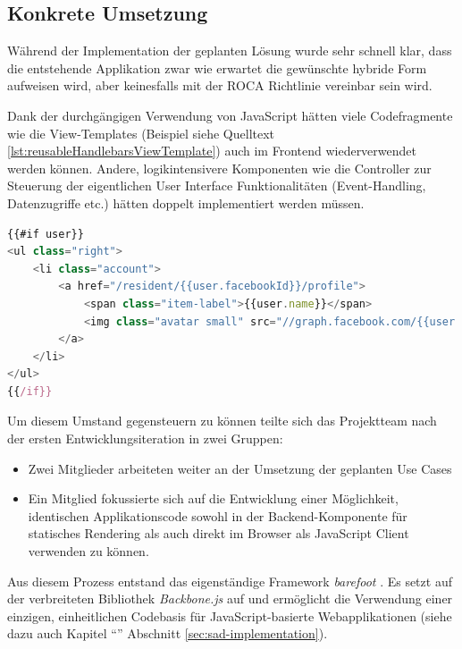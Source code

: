 \subsection*{Konkrete Umsetzung}

Während der Implementation der geplanten Lösung wurde sehr schnell klar, dass die entstehende Applikation zwar wie erwartet die gewünschte hybride Form aufweisen wird, aber keinesfalls mit der ROCA Richtlinie \emph{} vereinbar sein wird.

Dank der durchgängigen Verwendung von JavaScript hätten viele Codefragmente wie die View-Templates (Beispiel siehe Quelltext \ref{lst:reusableHandlebarsViewTemplate}) auch im Frontend wiederverwendet werden können. Andere, logikintensivere Komponenten wie die Controller zur Steuerung der eigentlichen User Interface Funktionalitäten (Event-Handling, Datenzugriffe etc.) hätten doppelt implementiert werden müssen.

\begin{lstlisting}[language=JavaScript, firstnumber=31, caption={Ausschnitt aus dem \emph{Handlebars} \cite{Handlebars} Template zur Darstellung von Benutzerinformation in der Menüleiste von \emph{Roomies} \cite{roomiesMenuTemplate}}, label={lst:reusableHandlebarsViewTemplate}]
{{#if user}}
<ul class="right">
	<li class="account">
		<a href="/resident/{{user.facebookId}}/profile">
			<span class="item-label">{{user.name}}</span>
			<img class="avatar small" src="//graph.facebook.com/{{user.facebookId}}/picture" />
		</a>
	</li>
</ul>
{{/if}}
\end{lstlisting}

Um diesem Umstand gegensteuern zu können teilte sich das Projektteam nach der ersten Entwicklungsiteration in zwei Gruppen:

\begin{itemize}
	\item Zwei Mitglieder arbeiteten weiter an der Umsetzung der geplanten Use Cases
	\item Ein Mitglied fokussierte sich auf die Entwicklung einer Möglichkeit, identischen Applikationscode sowohl in der Backend-Komponente für statisches Rendering als auch direkt im Browser als JavaScript Client verwenden zu können.
\end{itemize}

Aus diesem Prozess entstand das eigenständige Framework \emph{barefoot} \cite{Barefoot}. Es setzt auf der verbreiteten Bibliothek \emph{Backbone.js} \cite{Backbonejs} auf und ermöglicht die Verwendung einer einzigen, einheitlichen Codebasis für JavaScript-basierte Webapplikationen (siehe dazu auch Kapitel ``'' Abschnitt \ref{sec:sad-implementation}).

